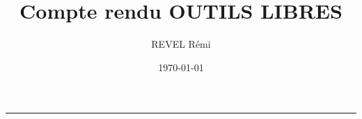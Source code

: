 \documentclass{article}
\title{Compte rendu OUTILS LIBRES}
\author{REVEL Rémi}
\date{\today}
\begin{document}
\maketitle
\par\noindent\rule{\textwidth}{0.4pt}
\end{document}
